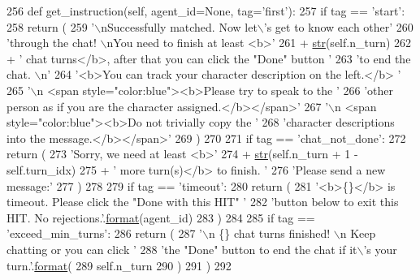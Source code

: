 \begin{DoxyCode}
256     \textcolor{keyword}{def }get\_instruction(self, agent\_id=None, tag='first'):
257         \textcolor{keywordflow}{if} tag == \textcolor{stringliteral}{'start'}:
258             \textcolor{keywordflow}{return} (
259                 \textcolor{stringliteral}{'\(\backslash\)nSuccessfully matched. Now let\(\backslash\)'s get to know each other'}
260                 \textcolor{stringliteral}{'through the chat! \(\backslash\)nYou need to finish at least <b>'}
261                 + \hyperlink{namespacegenerate__task__READMEs_a5b88452ffb87b78c8c85ececebafc09f}{str}(self.n\_turn)
262                 + \textcolor{stringliteral}{' chat turns</b>, after that you can click the "Done" button '}
263                 \textcolor{stringliteral}{'to end the chat. \(\backslash\)n'}
264                 \textcolor{stringliteral}{'<b>You can track your character description on the left.</b> '}
265                 \textcolor{stringliteral}{'\(\backslash\)n <span style="color:blue"><b>Please try to speak to the '}
266                 \textcolor{stringliteral}{'other person as if you are the character assigned.</b></span>'}
267                 \textcolor{stringliteral}{'\(\backslash\)n <span style="color:blue"><b>Do not trivially copy the '}
268                 \textcolor{stringliteral}{'character descriptions into the message.</b></span>'}
269             )
270 
271         \textcolor{keywordflow}{if} tag == \textcolor{stringliteral}{'chat\_not\_done'}:
272             \textcolor{keywordflow}{return} (
273                 \textcolor{stringliteral}{'Sorry, we need at least <b>'}
274                 + \hyperlink{namespacegenerate__task__READMEs_a5b88452ffb87b78c8c85ececebafc09f}{str}(self.n\_turn + 1 - self.turn\_idx)
275                 + \textcolor{stringliteral}{' more turn(s)</b> to finish. '}
276                 \textcolor{stringliteral}{'Please send a new message:'}
277             )
278 
279         \textcolor{keywordflow}{if} tag == \textcolor{stringliteral}{'timeout'}:
280             \textcolor{keywordflow}{return} (
281                 \textcolor{stringliteral}{'<b>\{\}</b> is timeout. Please click the "Done with this HIT" '}
282                 \textcolor{stringliteral}{'button below to exit this HIT. No rejections.'}.\hyperlink{namespaceparlai_1_1chat__service_1_1services_1_1messenger_1_1shared__utils_a32e2e2022b824fbaf80c747160b52a76}{format}(agent\_id)
283             )
284 
285         \textcolor{keywordflow}{if} tag == \textcolor{stringliteral}{'exceed\_min\_turns'}:
286             \textcolor{keywordflow}{return} (
287                 \textcolor{stringliteral}{'\(\backslash\)n \{\} chat turns finished! \(\backslash\)n Keep chatting or you can click '}
288                 \textcolor{stringliteral}{'the "Done" button to end the chat if it\(\backslash\)'s your turn.'}.\hyperlink{namespaceparlai_1_1chat__service_1_1services_1_1messenger_1_1shared__utils_a32e2e2022b824fbaf80c747160b52a76}{format}(
289                     self.n\_turn
290                 )
291             )
292 
\end{DoxyCode}
